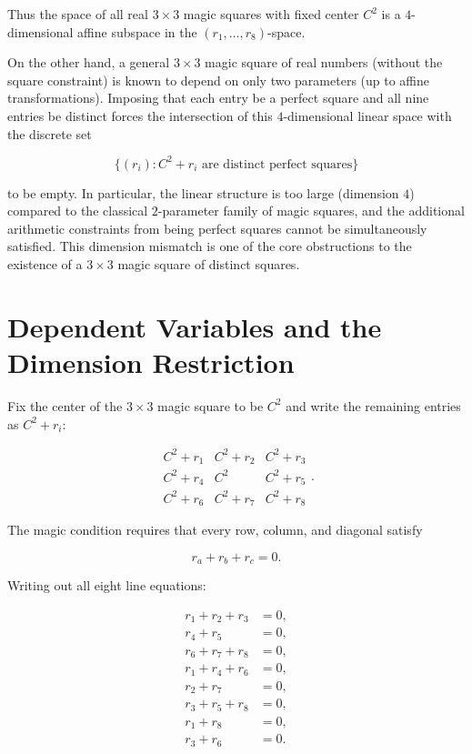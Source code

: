\documentclass[12pt]{article}
\begin{document}
Thus the space of all real $3\times 3$ magic squares with fixed center $C^2$
is a $4$-dimensional affine subspace in the $(r_1,\dots,r_8)$-space.

On the other hand, a general $3\times 3$ magic square of real numbers (without
the square constraint) is known to depend on only two parameters (up to affine
transformations).  Imposing that each entry be a perfect square and all nine
entries be distinct forces the intersection of this $4$-dimensional linear
space with the discrete set


\[
\{(r_i) : C^2 + r_i \text{ are distinct perfect squares}\}
\]


to be empty.  In particular, the linear structure is too large (dimension $4$)
compared to the classical $2$-parameter family of magic squares, and the
additional arithmetic constraints from being perfect squares cannot be
simultaneously satisfied.  This dimension mismatch is one of the core
obstructions to the existence of a $3\times 3$ magic square of distinct
squares.




\section*{Dependent Variables and the Dimension Restriction}

Fix the center of the $3\times 3$ magic square to be $C^2$ and write the
remaining entries as $C^2 + r_i$:


\[
\begin{matrix}
C^2+r_1 & C^2+r_2 & C^2+r_3 \\
C^2+r_4 & C^2     & C^2+r_5 \\
C^2+r_6 & C^2+r_7 & C^2+r_8
\end{matrix}.
\]



The magic condition requires that every row, column, and diagonal satisfy


\[
r_a + r_b + r_c = 0.
\]



Writing out all eight line equations:


\[
\begin{aligned}
r_1+r_2+r_3 &= 0,\\
r_4+r_5 &= 0,\\
r_6+r_7+r_8 &= 0,\\
r_1+r_4+r_6 &= 0,\\
r_2+r_7 &= 0,\\
r_3+r_5+r_8 &= 0,\\
r_1+r_8 &= 0,\\
r_3+r_6 &= 0.
\end{aligned}
\]
\end{document}
